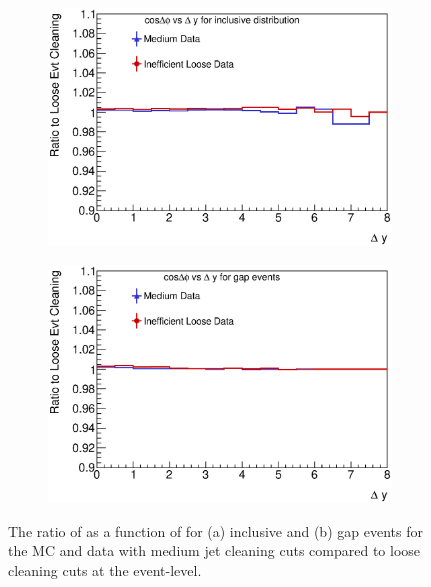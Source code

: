 \begin{figure}
\centering
        \begin{subfigure}[b]{0.5\textwidth}
                \centering
                \includegraphics[width=\textwidth]{figures/GBJ2/jetcleaning/Clean___cosdPhi_deltaY_Ratio_MediumLoose_Evt_Data.eps}
        \end{subfigure}%
        \begin{subfigure}[b]{0.5\textwidth}
                \centering
                \includegraphics[width=\textwidth]{figures/GBJ2/jetcleaning/Clean___cosdPhi_deltaY_gap_Ratio_MediumLoose_Evt_Data.eps}
        \end{subfigure}%
\caption[Comparison loose between and medium cleaning cuts on \mean{\cosdphi{}}]{
The ratio of \mean{\cosdphi{}} as a function of \dy{} for (a) inclusive and (b) gap events for the MC and data with medium jet cleaning cuts compared to loose cleaning cuts at the event-level.
\label{GBJ2:JetCleaning:cos_ML}}
\end{figure}



